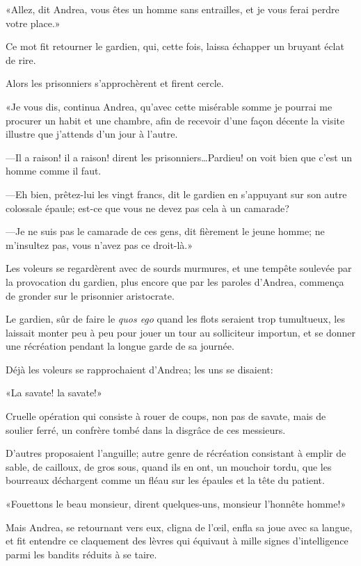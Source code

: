 «Allez, dit Andrea, vous êtes un homme sans entrailles, et je vous ferai perdre votre place.» 

Ce mot fit retourner le gardien, qui, cette fois, laissa échapper un bruyant éclat de rire. 

Alors les prisonniers s'approchèrent et firent cercle. 

«Je vous dis, continua Andrea, qu'avec cette misérable somme je pourrai me procurer un habit et une chambre, afin de recevoir d'une façon décente la visite illustre que j'attends d'un jour à l'autre. 

—Il a raison! il a raison! dirent les prisonniers\dots Pardieu! on voit bien que c'est un homme comme il faut. 

—Eh bien, prêtez-lui les vingt francs, dit le gardien en s'appuyant sur son autre colossale épaule; est-ce que vous ne devez pas cela à un camarade? 

—Je ne suis pas le camarade de ces gens, dit fièrement le jeune homme; ne m'insultez pas, vous n'avez pas ce droit-là.» 

Les voleurs se regardèrent avec de sourds murmures, et une tempête soulevée par la provocation du gardien, plus encore que par les paroles d'Andrea, commença de gronder sur le prisonnier aristocrate. 

Le gardien, sûr de faire le \textit{quos ego} quand les flots seraient trop tumultueux, les laissait monter peu à peu pour jouer un tour au solliciteur importun, et se donner une récréation pendant la longue garde de sa journée. 

Déjà les voleurs se rapprochaient d'Andrea; les uns se disaient: 

«La savate! la savate!» 

Cruelle opération qui consiste à rouer de coups, non pas de savate, mais de soulier ferré, un confrère tombé dans la disgrâce de ces messieurs. 

D'autres proposaient l'anguille; autre genre de récréation consistant à emplir de sable, de cailloux, de gros sous, quand ils en ont, un mouchoir tordu, que les bourreaux déchargent comme un fléau sur les épaules et la tête du patient. 

«Fouettons le beau monsieur, dirent quelques-uns, monsieur l'honnête homme!» 

Mais Andrea, se retournant vers eux, cligna de l'œil, enfla sa joue avec sa langue, et fit entendre ce claquement des lèvres qui équivaut à mille signes d'intelligence parmi les bandits réduits à se taire. 

